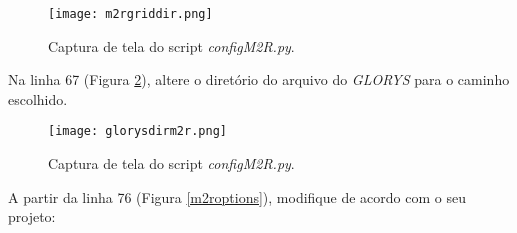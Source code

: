 \begin{figure}[H]
    \centering
    \texttt{[image: m2rgriddir.png]}
    \caption{Captura de tela do script \textit{configM2R.py}.}
    \label{gradediretoriom2r}
\end{figure}
\bigskip

\noindent Na linha 67 (Figura \textcolor{bleu_cite}{\ref{glorysdirm2r}}), altere o diretório do arquivo do \textit{GLORYS} para o caminho escolhido.
\bigskip


\begin{figure}[H]
    \centering
    \texttt{[image: glorysdirm2r.png]}
    \caption{Captura de tela do script \textit{configM2R.py}.}
    \label{glorysdirm2r}
\end{figure}
\bigskip

\noindent A partir da linha 76 (Figura \textcolor{bleu_cite}{\ref{m2roptions}}), modifique de acordo com o seu projeto:
\bigskip

